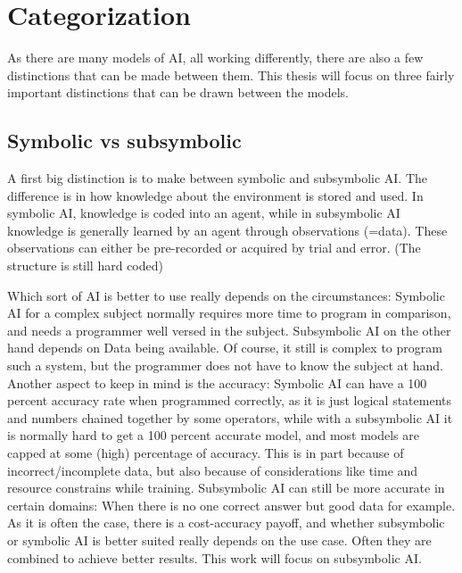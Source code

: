 \chapter{Categorization}
As there are many models of AI, all working differently, there are also a few distinctions that can be made between them. This thesis will focus on three fairly important distinctions that can be drawn between the models.
\section{Symbolic vs subsymbolic}
A first big distinction is to make between symbolic and subsymbolic AI. 
The difference is in how knowledge about the environment is stored and used. %
In symbolic AI, knowledge is coded into an agent, while in subsymbolic AI knowledge is generally learned by an agent through observations (=data). These observations can either be pre-recorded or acquired by trial and error. (The structure is still hard coded)

Which sort of AI is better to use really depends on the circumstances: 
Symbolic AI for a complex subject normally requires more time to program in comparison, and needs a programmer well versed in the subject. 
Subsymbolic AI on the other hand depends on Data being available. Of course, it still is complex to program such a system, but the programmer does not have to know the subject at hand. %
Another aspect to keep in mind is the accuracy: Symbolic AI can have a 100 percent accuracy rate when programmed correctly, as it is just logical statements and numbers chained together by some operators, while with a subsymbolic AI it is normally hard to get a 100 percent accurate model, and most models are capped at some (high) percentage of accuracy. This is in part because of incorrect/incomplete data, but also because of considerations like time and resource constrains while training. Subsymbolic AI can still be more accurate in certain domains: When there is no one correct answer but good data for example.
As it is often the case, there is a cost-accuracy payoff, and whether subsymbolic or symbolic AI is better suited really depends on the use case. Often they are combined to achieve better results. This work will focus on subsymbolic AI. \cite{semisupervised}
